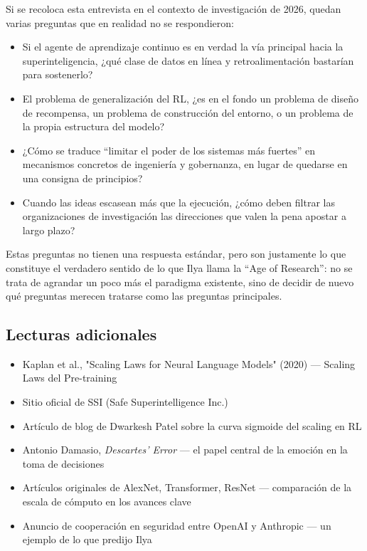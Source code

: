 Si se recoloca esta entrevista en el contexto de investigación de 2026, quedan varias preguntas que en realidad no se respondieron:
\begin{itemize}
    \item Si el agente de aprendizaje continuo es en verdad la vía principal hacia la superinteligencia, ¿qué clase de datos en línea y retroalimentación bastarían para sostenerlo?
    \item El problema de generalización del RL, ¿es en el fondo un problema de diseño de recompensa, un problema de construcción del entorno, o un problema de la propia estructura del modelo?
    \item ¿Cómo se traduce ``limitar el poder de los sistemas más fuertes'' en mecanismos concretos de ingeniería y gobernanza, en lugar de quedarse en una consigna de principios?
    \item Cuando las ideas escasean más que la ejecución, ¿cómo deben filtrar las organizaciones de investigación las direcciones que valen la pena apostar a largo plazo?
\end{itemize}

Estas preguntas no tienen una respuesta estándar, pero son justamente lo que constituye el verdadero sentido de lo que Ilya llama la ``Age of Research'': no se trata de agrandar un poco más el paradigma existente, sino de decidir de nuevo qué preguntas merecen tratarse como las preguntas principales.

\subsection{Lecturas adicionales}

\begin{itemize}
    \item Kaplan et al., "Scaling Laws for Neural Language Models" (2020) --- Scaling Laws del Pre-training
    \item Sitio oficial de SSI (Safe Superintelligence Inc.)
    \item Artículo de blog de Dwarkesh Patel sobre la curva sigmoide del scaling en RL
    \item Antonio Damasio, \textit{Descartes' Error} --- el papel central de la emoción en la toma de decisiones
    \item Artículos originales de AlexNet, Transformer, ResNet --- comparación de la escala de cómputo en los avances clave
    \item Anuncio de cooperación en seguridad entre OpenAI y Anthropic --- un ejemplo de lo que predijo Ilya
\end{itemize}



